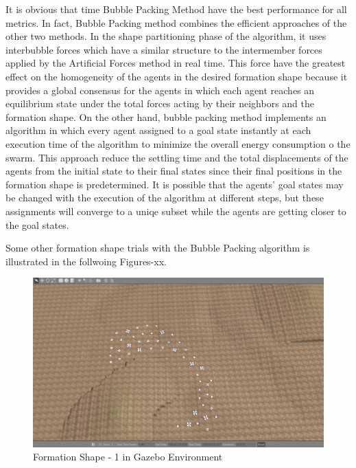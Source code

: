 		It is obvious that time Bubble Packing Method have the best performance for all metrics. In fact, Bubble Packing method combines the efficient approaches of the other two methods. In the shape partitioning phase of the algorithm, it uses interbubble forces which have a similar structure to the intermember forces applied by the Artificial Forces method in real time. This force have the greatest  effect on the homogeneity of the agents in the desired formation shape because it provides a global consensus for the agents in which each agent reaches an equilibrium state under the total forces acting by their neighbors and the formation shape. On the other hand, bubble packing method implements an algorithm in which every agent assigned to a goal state instantly at each execution time of the algorithm to minimize the overall energy consumption o the swarm. This approach reduce the settling time and the total displacements of the agents from the initial state to their final states since their final positions in the formation shape is predetermined. It is possible that the agents' goal states may be changed with the execution of the algorithm at different steps, but these assignments will converge to a uniqe subset while the agents are getting closer to the goal states. 
		
Some other formation shape trials with the Bubble Packing algorithm is illustrated in the follwoing Figures-xx.


		
		 \begin{figure}[H]
		 	\caption{Formation Shape - 1 in Gazebo Environment}
		 	\centerline{\includegraphics[scale = 0.35]{1_Gazebo}}
		 \end{figure} 
			
